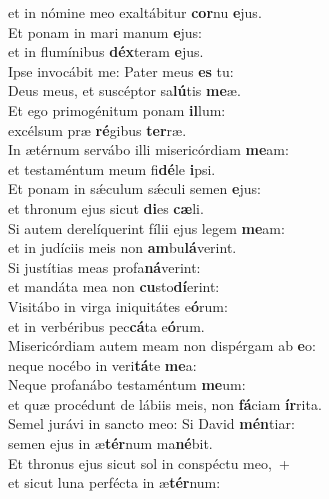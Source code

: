 \evenverse et in nómine meo exaltábitur \textbf{cor}nu \textbf{e}jus.\\
\oddverse Et ponam in mari manum \textbf{e}jus:~\*\\
\oddverse et in flumínibus \textbf{déx}teram \textbf{e}jus.\\
\evenverse Ipse invocábit me: Pater meus \textbf{es} tu:~\*\\
\evenverse Deus meus, et suscéptor sa\textbf{lú}tis \textbf{me}æ.\\
\oddverse Et ego primogénitum ponam \textbf{il}lum:~\*\\
\oddverse excélsum præ \textbf{ré}gibus \textbf{ter}ræ.\\
\evenverse In ætérnum servábo illi misericórdiam \textbf{me}am:~\*\\
\evenverse et testaméntum meum fi\textbf{dé}le \textbf{i}psi.\\
\oddverse Et ponam in sǽculum sǽculi semen \textbf{e}jus:~\*\\
\oddverse et thronum ejus sicut \textbf{di}es \textbf{cæ}li.\\
\evenverse Si autem derelíquerint fílii ejus legem \textbf{me}am:~\*\\
\evenverse et in judíciis meis non \textbf{am}bu\textbf{lá}verint.\\
\oddverse Si justítias meas profa\textbf{ná}verint:~\*\\
\oddverse et mandáta mea non \textbf{cu}sto\textbf{dí}erint:\\
\evenverse Visitábo in virga iniquitátes e\textbf{ó}rum:~\*\\
\evenverse et in verbéribus pec\textbf{cá}ta e\textbf{ó}rum.\\
\oddverse Misericórdiam autem meam non dispérgam ab \textbf{e}o:~\*\\
\oddverse neque nocébo in veri\textbf{tá}te \textbf{me}a:\\
\evenverse Neque profanábo testaméntum \textbf{me}um:~\*\\
\evenverse et quæ procédunt de lábiis meis, non \textbf{fá}ciam \textbf{ír}rita.\\
\oddverse Semel jurávi in sancto meo: Si David \textbf{mén}tiar:~\*\\
\oddverse semen ejus in æ\textbf{tér}num ma\textbf{né}bit.\\
\evenverse Et thronus ejus sicut sol in conspéctu meo,~+\\
\evenverse  et sicut luna perfécta in æ\textbf{tér}num:~\*\\
